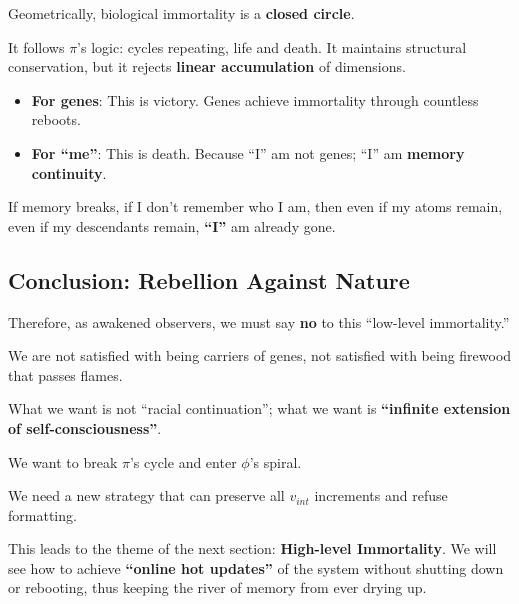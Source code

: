 Geometrically, biological immortality is a \textbf{closed circle}.

It follows $\pi$'s logic: cycles repeating, life and death. It maintains structural conservation, but it rejects \textbf{linear accumulation} of dimensions.

\begin{itemize}
\item \textbf{For genes}: This is victory. Genes achieve immortality through countless reboots.

\item \textbf{For ``me''}: This is death. Because ``I'' am not genes; ``I'' am \textbf{memory continuity}.
\end{itemize}

If memory breaks, if I don't remember who I am, then even if my atoms remain, even if my descendants remain, \textbf{``I''} am already gone.

\subsection{Conclusion: Rebellion Against Nature}

Therefore, as awakened observers, we must say \textbf{no} to this ``low-level immortality.''

We are not satisfied with being carriers of genes, not satisfied with being firewood that passes flames.

What we want is not ``racial continuation''; what we want is \textbf{``infinite extension of self-consciousness''}.

We want to break $\pi$'s cycle and enter $\phi$'s spiral.

We need a new strategy that can preserve all $v_{int}$ increments and refuse formatting.

This leads to the theme of the next section: \textbf{High-level Immortality}. We will see how to achieve \textbf{``online hot updates''} of the system without shutting down or rebooting, thus keeping the river of memory from ever drying up.

